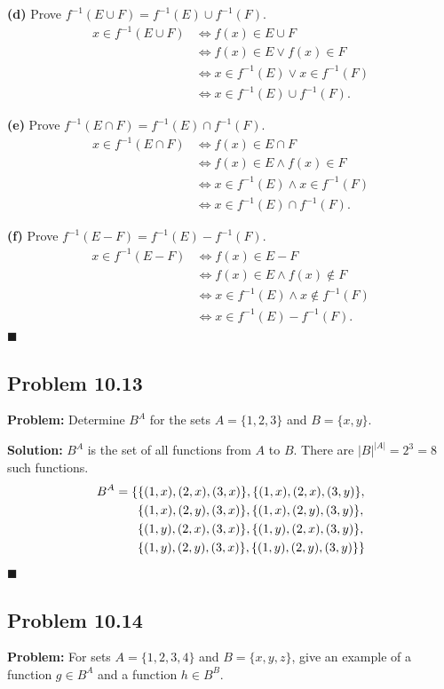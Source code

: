 \documentclass[11pt, a4paper]{article}
\theoremstyle{definition}
\theoremstyle{remark}
\begin{document}
\textbf{(d)} Prove $f^{-1}(E \cup F) = f^{-1}(E) \cup f^{-1}(F)$.
\begin{align*}
    x \in f^{-1}(E \cup F) &\iff f(x) \in E \cup F \\
    &\iff f(x) \in E \lor f(x) \in F \\
    &\iff x \in f^{-1}(E) \lor x \in f^{-1}(F) \\
    &\iff x \in f^{-1}(E) \cup f^{-1}(F).
\end{align*}

\textbf{(e)} Prove $f^{-1}(E \cap F) = f^{-1}(E) \cap f^{-1}(F)$.
\begin{align*}
    x \in f^{-1}(E \cap F) &\iff f(x) \in E \cap F \\
    &\iff f(x) \in E \land f(x) \in F \\
    &\iff x \in f^{-1}(E) \land x \in f^{-1}(F) \\
    &\iff x \in f^{-1}(E) \cap f^{-1}(F).
\end{align*}

\textbf{(f)} Prove $f^{-1}(E - F) = f^{-1}(E) - f^{-1}(F)$.
\begin{align*}
    x \in f^{-1}(E - F) &\iff f(x) \in E - F \\
    &\iff f(x) \in E \land f(x) \notin F \\
    &\iff x \in f^{-1}(E) \land x \notin f^{-1}(F) \\
    &\iff x \in f^{-1}(E) - f^{-1}(F).
\end{align*}
$\blacksquare$

\subsection{Problem 10.13}
\textbf{Problem:} Determine $B^A$ for the sets $A = \{1, 2, 3\}$ and $B = \{x, y\}$.

\textbf{Solution:}
$B^A$ is the set of all functions from $A$ to $B$. There are $|B|^{|A|} = 2^3 = 8$ such functions.
\begin{align*}
    B^A = \{ &\{(1,x), (2,x), (3,x)\}, \{(1,x), (2,x), (3,y)\}, \\ \relax
    &\{(1,x), (2,y), (3,x)\}, \{(1,x), (2,y), (3,y)\}, \\ \relax
    &\{(1,y), (2,x), (3,x)\}, \{(1,y), (2,x), (3,y)\}, \\ \relax
    &\{(1,y), (2,y), (3,x)\}, \{(1,y), (2,y), (3,y)\} \}
\end{align*}
$\blacksquare$

\subsection{Problem 10.14}
\textbf{Problem:} For sets $A = \{1, 2, 3, 4\}$ and $B = \{x, y, z\}$, give an example of a function $g \in B^A$ and a function $h \in B^B$.
\end{document}
